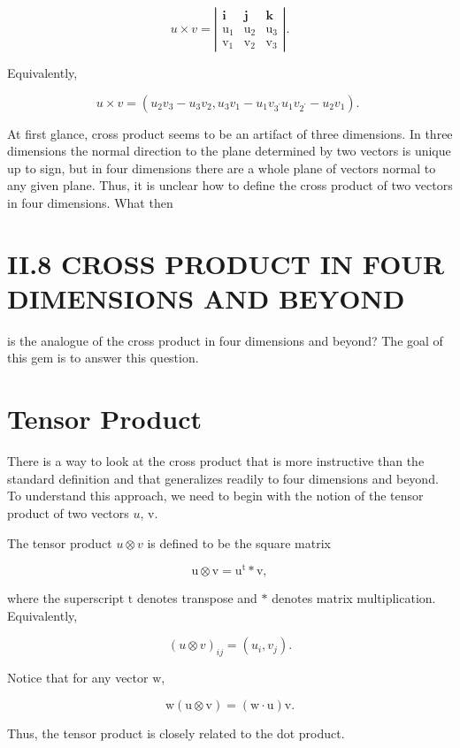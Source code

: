 \begin{CJK}{UTF8}{gbsn}
$$
u \times v=\left|\begin{array}{ccc}
\mathbf{i} & \mathbf{j} & \mathbf{k} \\
\mathrm{u}_{1} & \mathrm{u}_{2} & \mathrm{u}_{3} \\
\mathrm{v}_{1} & \mathrm{v}_{2} & \mathrm{v}_{3}
\end{array}\right| .
$$

Equivalently,

$$
u \times v=\left(u_{2} v_{3}-u_{3} v_{2}, u_{3} v_{1}-u_{1} v_{3^{\prime}} u_{1} v_{2^{\prime}}-u_{2} v_{1}\right) \text {. }
$$

At first glance, cross product seems to be an artifact of three dimensions. In three dimensions the normal direction to the plane determined by two vectors is unique up to sign, but in four dimensions there are a whole plane of vectors normal to any given plane. Thus, it is unclear how to define the cross product of two vectors in four dimensions. What then

\section{II.8 CROSS PRODUCT IN FOUR DIMENSIONS AND BEYOND}
is the analogue of the cross product in four dimensions and beyond? The goal of this gem is to answer this question.

\section{Tensor Product}
There is a way to look at the cross product that is more instructive than the standard definition and that generalizes readily to four dimensions and beyond. To understand this approach, we need to begin with the notion of the tensor product of two vectors $u$, v.

The tensor product $u \otimes v$ is defined to be the square matrix

$$
\mathrm{u} \otimes \mathrm{v}=\mathrm{u}^{\mathrm{t}} * \mathrm{v},
$$

where the superscript $\mathrm{t}$ denotes transpose and $*$ denotes matrix multiplication. Equivalently,

$$
(u \otimes v)_{i j}=\left(u_{i}, v_{j}\right) .
$$

Notice that for any vector $\mathrm{w}$,

$$
\mathrm{w}(\mathrm{u} \otimes \mathrm{v})=(\mathrm{w} \cdot \mathrm{u}) \mathrm{v} .
$$

Thus, the tensor product is closely related to the dot product.


\end{CJK}
